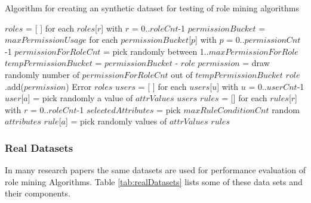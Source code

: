 \begin{algorithm}
\caption{Algorithm for creating an synthetic dataset for testing of role mining algorithms}
\label{alg:CreateDataSet}
\begin{algorithmic}[1]
    \State $roles$ = [ ] for each $roles$[$r$] with $r$ = 0..$roleCnt$-1
    \State $permissionBucket$ = $maxPermissionUsage$ for each $permissionBucket$[$p$] with $p$ = 0..$permissionCnt$-1
        \State $permissionForRoleCnt$ = pick randomly between 1..$maxPermissionForRole$
        \State $tempPermissionBucket$ = $permissionBucket$ - $role$
            \State $permission$ = draw randomly number of $permissionForRoleCnt$ out of $tempPermissionBucket$
            \State $role$.add($permission$)
        \Else
            \State Error
        \EndIf
    \EndFor
    \State \Return $roles$
\EndProcedure
\State
{}
    \State $users$ = [ ] for each $users$[$u$] with $u$ = 0..$userCnt$-1
            \State $user$[$a$] = pick randomly a value of $attrValues$
        \EndFor
    \EndFor
    \State \Return $users$
\EndProcedure
\State
{}
    \State $rules$ = [{}] for each $rules$[$r$] with $r$ = 0..$roleCnt$-1
        \State $selectedAttributes$ = pick $maxRuleConditionCnt$ random $attributes$
            \State $rule$[$a$] = pick randomly values of $attrValues$
        \EndFor
    \EndFor
    \State \Return $rules$
\EndProcedure
\end{algorithmic}
\end{algorithm}

\subsubsection{Real Datasets}
In many research papers the same datasets are used for performance evaluation of role mining Algorithms. Table \ref{tab:realDatasets} lists some of these data sets and their components.

